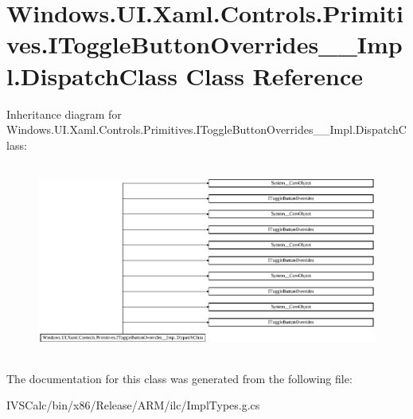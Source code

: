 \hypertarget{class_windows_1_1_u_i_1_1_xaml_1_1_controls_1_1_primitives_1_1_i_toggle_button_overrides_____impl_1_1_dispatch_class}{}\section{Windows.\+U\+I.\+Xaml.\+Controls.\+Primitives.\+I\+Toggle\+Button\+Overrides\+\_\+\+\_\+\+Impl.\+Dispatch\+Class Class Reference}
\label{class_windows_1_1_u_i_1_1_xaml_1_1_controls_1_1_primitives_1_1_i_toggle_button_overrides_____impl_1_1_dispatch_class}
Inheritance diagram for Windows.\+U\+I.\+Xaml.\+Controls.\+Primitives.\+I\+Toggle\+Button\+Overrides\+\_\+\+\_\+\+Impl.\+Dispatch\+Class\+:\begin{figure}[H]
\begin{center}
\leavevmode
\includegraphics[height=6.376812cm]{class_windows_1_1_u_i_1_1_xaml_1_1_controls_1_1_primitives_1_1_i_toggle_button_overrides_____impl_1_1_dispatch_class}
\end{center}
\end{figure}


The documentation for this class was generated from the following file\+:\begin{DoxyCompactItemize}
\item 
I\+V\+S\+Calc/bin/x86/\+Release/\+A\+R\+M/ilc/Impl\+Types.\+g.\+cs\end{DoxyCompactItemize}
